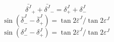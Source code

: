 \begin{equation}\label{eq:Blatt-en}
\bar{\delta^J}_++\bar{\delta^J}_-=\delta^J_++\delta^J_-
\end{equation}
\begin{equation}\label{eq:Blatt-to}
\sin(\bar{\delta}^J_--\bar{\delta}^J_+)=\tan 2\bar{\varepsilon}^J/\tan 2{\varepsilon}^J
\end{equation}
\begin{equation}\label{eq:Blatt-tre}
\sin(\delta^J_--\delta^J_+)=\tan 2\bar{\varepsilon}^J/\tan 2{\varepsilon}^J 
\end{equation}








